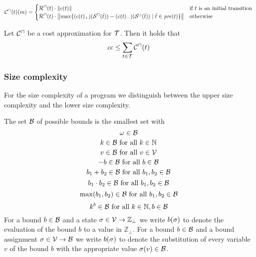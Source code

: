 \begin{definition}
  \[ {\mathcal{C}^\sqcap}(t)(m) =
  \begin{cases}
    {\mathcal{R}^\sqcap}(t) \cdot \left\Vert c(t)\right\Vert & \text{if } t \text{ is an initial transition} \\
    {\mathcal{R}^\sqcap}(t) \cdot \left\Vert\max \lbrace (c(t)_+)({\mathcal{S}^\sqcap}(\tilde{t})) - (c(t)_-)({\mathcal{S}^\sqcup}(\tilde{t})) \mid \tilde{t} \in \mathit{pre}(t) \rbrace\right\Vert & \text{otherwise}
  \end{cases}
  \]
\end{definition}

\begin{theorem}
	Let ${\mathcal{C}^\sqcap}$ be a cost approximation for $\mathcal{T}$.
	Then it holds that 
	\[ \mathit{cc} \leq \sum_{t \in \mathcal{T}} {\mathcal{C}^\sqcap}(t) \]
\end{theorem}

\subsubsection{Size complexity}

For the size complexity of a program we distinguish between the upper size complexity and the lower size complexity.


\begin{definition}
	The set $\mathcal{B}$ of possible bounds is the smallest set with
	\[ \omega \in \mathcal{B} \]
	\[ k \in \mathcal{B} \text{ for all } k \in \mathbb{N} \] 
	\[ v \in \mathcal{B} \text{ for all } v \in \mathcal{V} \] 
	\[ -b \in \mathcal{B} \text{ for all } b \in \mathcal{B} \] 
	\[ b_1 + b_2 \in \mathcal{B} \text{ for all } b_1, b_2 \in \mathcal{B} \] 
	\[ b_1 \cdot b_2 \in \mathcal{B} \text{ for all } b_1, b_2 \in \mathcal{B} \] 
	\[ \max(b_1, b_2) \in \mathcal{B} \text{ for all } b_1, b_2 \in \mathcal{B} \]
	\[ k^b \in \mathcal{B} \text{ for all } k \in \mathbb{N}, b \in \mathcal{B} \]
        For a bound $b \in \mathcal{B}$ and a state $\sigma \in \mathcal{V} \rightarrow \mathbb{Z}_\bot$ we write $b(\sigma)$ to denote the evaluation of the bound $b$ to a value in $\mathbb{Z}_\bot$.
        For a bound $b \in \mathcal{B}$ and a bound assignment $\sigma \in \mathcal{V} \rightarrow \mathcal{B}$ we write $b(\sigma)$ to denote the substitution of every variable $v$ of the bound $b$ with the appropriate value $\sigma(v) \in \mathcal{B}$.
\end{definition}


